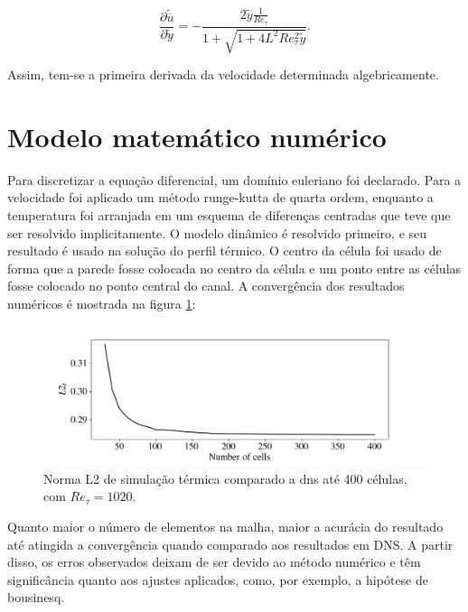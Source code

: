 \begin{equation}\label{finalequationvelocity}	
\frac{\partial \tilde{\overline{u}}}{\partial \tilde{y}} = - \frac{2 \tilde{y} \frac{1}{Re_\tau} }{ 1 + \sqrt{ 1 + 4 L ^2 Re_\tau ^2 \tilde{y}}}.
\end{equation}	

Assim, tem-se a primeira derivada da velocidade determinada algebricamente.

\newpage

\section{Modelo matemático numérico}

Para discretizar a equação diferencial, um domínio euleriano foi declarado. Para a velocidade foi aplicado um método runge-kutta de quarta ordem, enquanto a temperatura foi arranjada em um esquema de diferenças centradas que teve que ser resolvido implicitamente.
O modelo dinâmico é resolvido primeiro, e seu resultado é usado na solução do perfil térmico. O centro da célula foi usado de forma que a parede fosse colocada no centro da célula e um ponto entre as células fosse colocado no ponto central do canal. A convergência dos resultados numéricos é mostrada na figura \ref{sistema}:

\begin{figure}[!h]
	\centering
	\includegraphics[angle=0, trim={10mm 0mm 0mm 0mm}, clip , scale=0.50]{fotos_formatacao_final/Convergence}
	\caption{Norma L2 de simulação térmica comparado a dns até 400 células, com $Re_\tau = 1020$.}
	\label{sistema}
\end{figure}

Quanto maior o número de elementos na malha, maior a acurácia do resultado até atingida a convergência quando comparado aos resultados em DNS. A partir disso, os erros observados deixam de ser devido ao método numérico e têm significância quanto aos ajustes aplicados, como, por exemplo, a hipótese de bousinesq.

